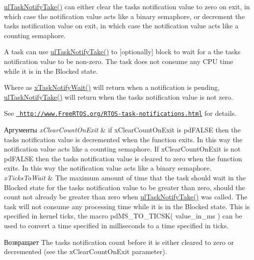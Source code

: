 \mbox{\hyperlink{task_8h_a66540bef602522a01a519f776e4c07d8}{ul\+Task\+Notify\+Take()}} can either clear the task\textquotesingle{}s notification value to zero on exit, in which case the notification value acts like a binary semaphore, or decrement the task\textquotesingle{}s notification value on exit, in which case the notification value acts like a counting semaphore.

A task can use \mbox{\hyperlink{task_8h_a66540bef602522a01a519f776e4c07d8}{ul\+Task\+Notify\+Take()}} to \mbox{[}optionally\mbox{]} block to wait for a the task\textquotesingle{}s notification value to be non-\/zero. The task does not consume any C\+PU time while it is in the Blocked state.

Where as \mbox{\hyperlink{task_8h_a0475fcda9718f403521c270a7270ff93}{x\+Task\+Notify\+Wait()}} will return when a notification is pending, \mbox{\hyperlink{task_8h_a66540bef602522a01a519f776e4c07d8}{ul\+Task\+Notify\+Take()}} will return when the task\textquotesingle{}s notification value is not zero.

See \href{http://www.FreeRTOS.org/RTOS-task-notifications.html}{\texttt{ http\+://www.\+Free\+R\+T\+O\+S.\+org/\+R\+T\+O\+S-\/task-\/notifications.\+html}} for details.


\begin{DoxyParams}{Аргументы}
{\em x\+Clear\+Count\+On\+Exit} & if x\+Clear\+Count\+On\+Exit is pd\+F\+A\+L\+SE then the task\textquotesingle{}s notification value is decremented when the function exits. In this way the notification value acts like a counting semaphore. If x\+Clear\+Count\+On\+Exit is not pd\+F\+A\+L\+SE then the task\textquotesingle{}s notification value is cleared to zero when the function exits. In this way the notification value acts like a binary semaphore.\\
\hline
{\em x\+Ticks\+To\+Wait} & The maximum amount of time that the task should wait in the Blocked state for the task\textquotesingle{}s notification value to be greater than zero, should the count not already be greater than zero when \mbox{\hyperlink{task_8h_a66540bef602522a01a519f776e4c07d8}{ul\+Task\+Notify\+Take()}} was called. The task will not consume any processing time while it is in the Blocked state. This is specified in kernel ticks, the macro pd\+M\+S\+\_\+\+T\+O\+\_\+\+T\+I\+C\+S\+K( value\+\_\+in\+\_\+ms ) can be used to convert a time specified in milliseconds to a time specified in ticks.\\
\hline
\end{DoxyParams}
\begin{DoxyReturn}{Возвращает}
The task\textquotesingle{}s notification count before it is either cleared to zero or decremented (see the x\+Clear\+Count\+On\+Exit parameter). 
\end{DoxyReturn}
